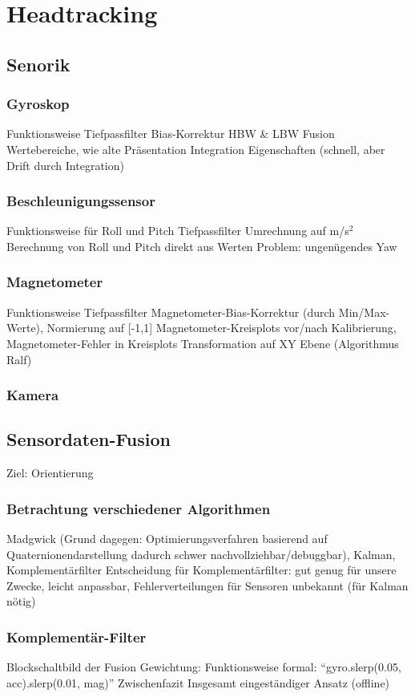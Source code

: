 \section{Headtracking}

\subsection{Senorik}
\subsubsection{Gyroskop}
Funktionsweise
Tiefpassfilter
Bias-Korrektur
HBW \& LBW Fusion
Wertebereiche, wie alte Präsentation
Integration
Eigenschaften (schnell, aber Drift durch Integration)
\subsubsection{Beschleunigungssensor}
Funktionsweise
für Roll und Pitch
Tiefpassfilter
Umrechnung auf m/s$^2$
Berechnung von Roll und Pitch direkt aus Werten
Problem: ungenügendes Yaw
\subsubsection{Magnetometer}
Funktionsweise
Tiefpassfilter
Magnetometer-Bias-Korrektur (durch Min/Max-Werte), Normierung auf [-1,1]
Magnetometer-Kreisplots vor/nach Kalibrierung, Magnetometer-Fehler in Kreisplots
Transformation auf XY Ebene (Algorithmus Ralf)
\subsubsection{Kamera}

\subsection{Sensordaten-Fusion}
Ziel: Orientierung
\subsubsection{Betrachtung verschiedener Algorithmen}
Madgwick (Grund dagegen: Optimierungsverfahren basierend auf Quaternionendarstellung dadurch schwer nachvollziehbar/debuggbar), Kalman, Komplementärfilter Entscheidung für Komplementärfilter: gut genug für unsere Zwecke, leicht anpassbar, Fehlerverteilungen für Sensoren unbekannt (für Kalman nötig)
\subsubsection{Komplementär-Filter}
Blockschaltbild der Fusion Gewichtung: Funktionsweise formal: “gyro.slerp(0.05, acc).slerp(0.01, mag)” Zwischenfazit Insgesamt eingeständiger Ansatz (offline)
